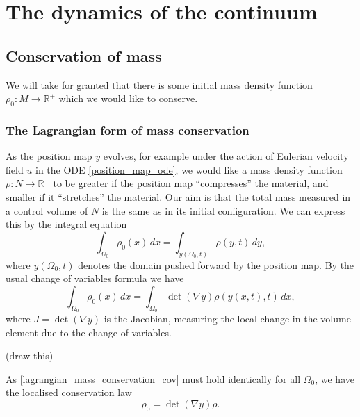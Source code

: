 \documentclass[11pt,a4paper]{memoir}
\newcommand{\omn}{{\Omega_0}}
\begin{document}
\section{The dynamics of the continuum}

\subsection{Conservation of mass}
We will take for granted that there is some initial mass density function $\rho_0:M\rightarrow \mathbb{R}^+$
which we would like to conserve.
\subsubsection{The Lagrangian form of mass conservation}
As the position map $y$ evolves, for example under the action of Eulerian velocity field $u$ in the ODE \eqref{position_map_ode},
we would like a mass density function $\rho : N \rightarrow \mathbb{R}^+$ to be greater if the position map ``compresses'' the material,
and smaller if it ``stretches'' the material. Our aim is that the total mass measured in a control volume of $N$ is the same as in its initial configuration.
We can express this by the integral equation
\begin{equation}\label{lagrangian_mass_conservation}
    \int_{\omn} \rho_0(x)\,dx = \int_{y(\omn, t)} \rho(y, t)\,dy,
\end{equation}
where $y(\omn, t)$ denotes the domain pushed forward by the position map. By the usual change of variables formula we have
\begin{equation}\label{lagrangian_mass_conservation_cov}
    \int_{\omn} \rho_0(x)\,dx = \int_{\omn} \det(\nabla y)\rho(y(x,t), t)\,dx,
\end{equation}
where $J = \det(\nabla y)$ is the Jacobian, measuring the local change in the volume element due to the change of variables.

\vskip 0.2in
(draw this)
\vskip 0.2in

As \eqref{lagrangian_mass_conservation_cov} must hold identically for all $\Omega_0$, we have the localised conservation law
\begin{equation}\label{lagrangian_mass_conservation_local}
    \rho_0 = \det(\nabla y)\rho.
\end{equation}
\end{document}
